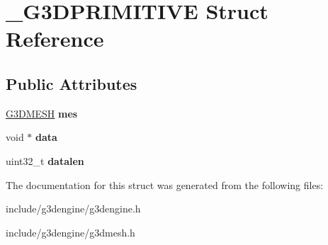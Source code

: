 \hypertarget{struct__G3DPRIMITIVE}{}\section{\+\_\+\+G3\+D\+P\+R\+I\+M\+I\+T\+I\+VE Struct Reference}
\label{struct__G3DPRIMITIVE}
\subsection*{Public Attributes}
\begin{DoxyCompactItemize}
\item 
\mbox{\label{struct__G3DPRIMITIVE_a962297db9f3a6182c22668738b2b2ced}} 
\hyperlink{struct__G3DMESH}{G3\+D\+M\+E\+SH} {\bfseries mes}
\item 
\mbox{\label{struct__G3DPRIMITIVE_a6d40b7e2820e1373667d510a4dde3af4}} 
void $\ast$ {\bfseries data}
\item 
\mbox{\label{struct__G3DPRIMITIVE_a5c053dff1e22ad9a95788a19723ae944}} 
uint32\+\_\+t {\bfseries datalen}
\end{DoxyCompactItemize}


The documentation for this struct was generated from the following files\+:\begin{DoxyCompactItemize}
\item 
include/g3dengine/g3dengine.\+h\item 
include/g3dengine/g3dmesh.\+h\end{DoxyCompactItemize}
